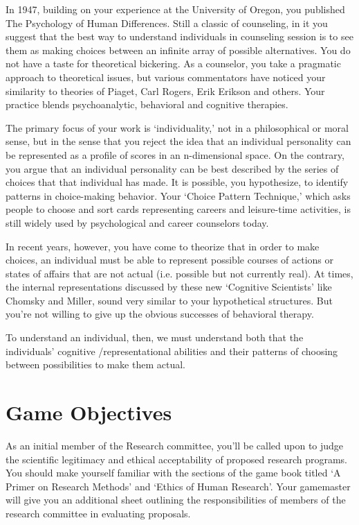\begin{refsection}
In 1947, building on your experience at the University of Oregon, you published The Psychology of Human Differences. Still a classic of counseling, in it you suggest that the best way to understand individuals in counseling session is to see them as making choices between an infinite array of possible alternatives. You do not have a taste for theoretical bickering. As a counselor, you take a pragmatic approach to theoretical issues, but various commentators have noticed your similarity to theories of Piaget, Carl Rogers, Erik Erikson and others. Your practice blends psychoanalytic, behavioral and cognitive therapies.

The primary focus of your work is `individuality,' not in a philosophical or moral sense, but in the sense that you reject the idea that an individual personality can be represented as a profile of scores in an n-dimensional space. On the contrary, you argue that an individual personality can be best described by the series of choices that that individual has made. It is possible, you hypothesize, to identify patterns in choice-making behavior. Your `Choice Pattern Technique,' which asks people to choose and sort cards representing careers and leisure-time activities, is still widely used by psychological and career counselors today.

In recent years, however, you have come to theorize that in order to make choices, an individual must be able to represent possible courses of actions or states of affairs that are not actual (i.e. possible but not currently real). At times, the internal representations discussed by these new `Cognitive Scientists' like Chomsky and Miller, sound very similar to your hypothetical structures. But you're not willing to give up the obvious successes of behavioral therapy.

To understand an individual, then, we must understand both that the individuals' cognitive \slash  representational abilities and their patterns of choosing between possibilities to make them actual.

\section{Game Objectives}
\label{gameobjectives}

As an initial member of the Research committee, you'll be called upon to judge the scientific legitimacy and ethical acceptability of proposed research programs. You should make yourself familiar with the sections of the game book titled `A Primer on Research Methods' and `Ethics of Human Research'. Your gamemaster will give you an additional sheet outlining the responsibilities of members of the research committee in evaluating proposals.


\end{refsection}

